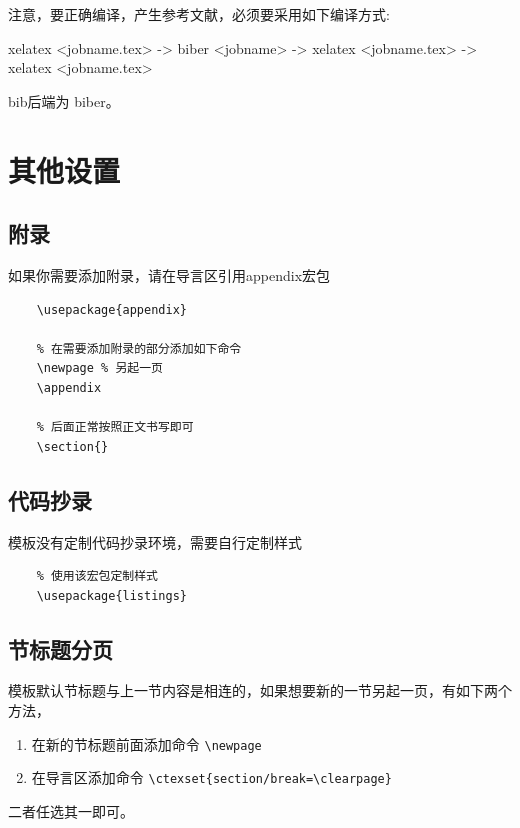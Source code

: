 注意，要正确编译，产生参考文献，必须要采用如下编译方式:

{\ttfamily xelatex <jobname.tex> -> biber <jobname> -> xelatex 
<jobname.tex> -> xelatex <jobname.tex>}

{\ttfamily bib}后端为 {\ttfamily biber}。
\printreference

\newpage
\appendix

\section{其他设置}
\subsection{附录}
如果你需要添加附录，请在导言区引用{\ttfamily appendix}宏包
\begin{lstlisting}
    \usepackage{appendix}

    % 在需要添加附录的部分添加如下命令
    \newpage % 另起一页
    \appendix 

    % 后面正常按照正文书写即可
    \section{}
\end{lstlisting}

\subsection{代码抄录}
模板没有定制代码抄录环境，需要自行定制样式
\begin{lstlisting}
    % 使用该宏包定制样式
    \usepackage{listings}
\end{lstlisting}

\subsection {节标题分页}
模板默认节标题与上一节内容是相连的，如果想要新的一节另起一页，有如下两个
方法，
\begin{enumerate}
    \item 在新的节标题前面添加命令 \lstinline|\newpage|
    \item 在导言区添加命令 \lstinline|\ctexset{section/break=\clearpage}|
\end{enumerate}
二者任选其一即可。
